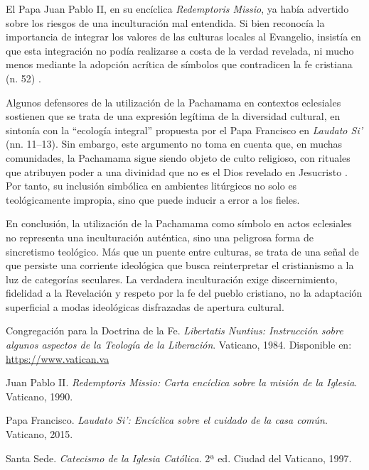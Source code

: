 \documentclass[12pt]{article}
\begin{document}
El Papa Juan Pablo II, en su encíclica \textit{Redemptoris Missio}, ya había advertido sobre los riesgos de una inculturación mal entendida. Si bien reconocía la importancia de integrar los valores de las culturas locales al Evangelio, insistía en que esta integración no podía realizarse a costa de la verdad revelada, ni mucho menos mediante la adopción acrítica de símbolos que contradicen la fe cristiana (n. 52) \cite{redemptoris}.

Algunos defensores de la utilización de la Pachamama en contextos eclesiales sostienen que se trata de una expresión legítima de la diversidad cultural, en sintonía con la “ecología integral” propuesta por el Papa Francisco en \textit{Laudato Si’} (nn. 11–13). Sin embargo, este argumento no toma en cuenta que, en muchas comunidades, la Pachamama sigue siendo objeto de culto religioso, con rituales que atribuyen poder a una divinidad que no es el Dios revelado en Jesucristo \cite{laudato}. Por tanto, su inclusión simbólica en ambientes litúrgicos no solo es teológicamente impropia, sino que puede inducir a error a los fieles.

En conclusión, la utilización de la Pachamama como símbolo en actos eclesiales no representa una inculturación auténtica, sino una peligrosa forma de sincretismo teológico. Más que un puente entre culturas, se trata de una señal de que persiste una corriente ideológica que busca reinterpretar el cristianismo a la luz de categorías seculares. La verdadera inculturación exige discernimiento, fidelidad a la Revelación y respeto por la fe del pueblo cristiano, no la adaptación superficial a modas ideológicas disfrazadas de apertura cultural.

\newpage
\begin{thebibliography}{9}

Congregación para la Doctrina de la Fe. 
\textit{Libertatis Nuntius: Instrucción sobre algunos aspectos de la Teología de la Liberación}. 
Vaticano, 1984. Disponible en: \url{https://www.vatican.va}

Juan Pablo II. 
\textit{Redemptoris Missio: Carta encíclica sobre la misión de la Iglesia}. 
Vaticano, 1990.

Papa Francisco. 
\textit{Laudato Si’: Encíclica sobre el cuidado de la casa común}. 
Vaticano, 2015.

Santa Sede. 
\textit{Catecismo de la Iglesia Católica}. 2ª ed. 
Ciudad del Vaticano, 1997.

\end{thebibliography}
\end{document}
